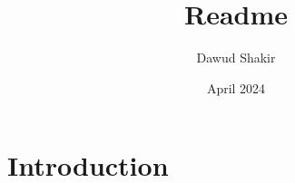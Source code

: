 \documentclass{article}
\title{Readme}
\author{Dawud Shakir}
\date{April 2024}
\begin{document}
\maketitle

\section{Introduction}
\end{document}
